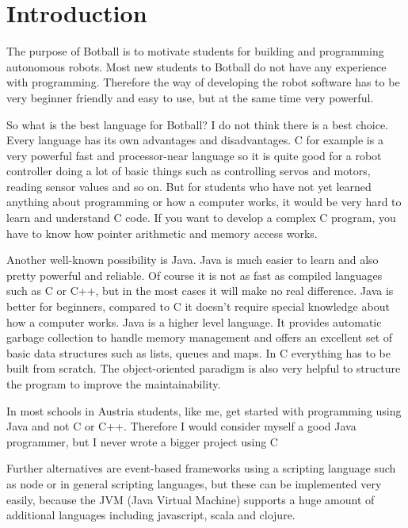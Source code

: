 \documentclass{juniorjournal}
\author[1, \corresp]{Markus Klein}\correspemail{m@mklein.co.at}
\author[1]{Christoph Hackenberger}
\author[1]{Melanie Goebel}
\author[1]{Klaus Ableitinger}
\affil[1]{Vienna Institute of Technology}
\begin{document}
\maketitle

\articleabstract{}
\keywords{}

\section{Introduction}
The purpose of Botball is to motivate students for building and programming autonomous
robots. Most new students to Botball do not have any experience with programming.
Therefore the way of developing the robot software has to be very beginner friendly and easy
to use, but at the same time very powerful.

So what is the best language for Botball? I do not think there is a best choice. Every language
has its own advantages and disadvantages. C for example is a very powerful fast and
processor-near language so it is quite good for a robot controller doing a lot of basic things
such as controlling servos and motors, reading sensor values and so on. But for students who
have not yet learned anything about programming or how a computer works, it would be very
hard to learn and understand C code. If you want to develop a complex C program, you have
to know how pointer arithmetic and memory access works.

Another well-known possibility is Java. Java is much easier to learn and also pretty
powerful and reliable. Of course it is not as fast as compiled languages such as C or C++, but
in the most cases it will make no real difference. Java is better for beginners, compared to C it
doesn’t require special knowledge about how a computer works. Java is a higher level
language. It provides automatic garbage collection to handle memory management and offers
an excellent set of basic data structures such as lists, queues and maps. In C everything has to
be built from scratch. The object-oriented paradigm is also very helpful to structure the
program to improve the maintainability.

In most schools in Austria students, like me, get started with programming using Java and not
C or C++. Therefore I would consider myself a good Java programmer, but I never wrote a
bigger project using C

Further alternatives are event-based frameworks using a scripting language such as node
or in general scripting languages, but these can be implemented very easily, because the JVM
(Java Virtual Machine) supports a huge amount of additional languages including
javascript, scala and clojure.
%

\begin{thebibliography}{500} %

\end{thebibliography}
\end{document}
